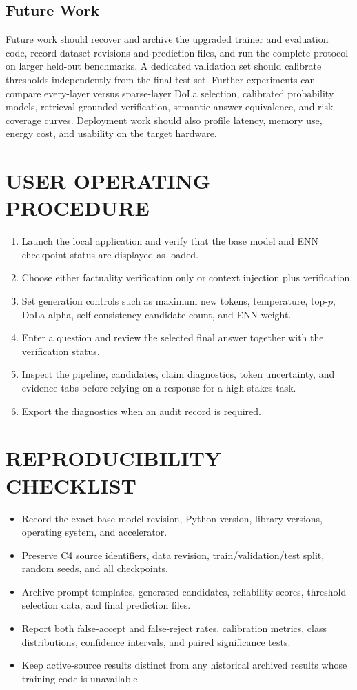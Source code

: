 \documentclass[12pt,a4paper,oneside]{report}
\begin{document}
\section{Future Work}
Future work should recover and archive the upgraded trainer and evaluation code, record dataset revisions and prediction files, and run the complete protocol on larger held-out benchmarks. A dedicated validation set should calibrate thresholds independently from the final test set. Further experiments can compare every-layer versus sparse-layer DoLa selection, calibrated probability models, retrieval-grounded verification, semantic answer equivalence, and risk-coverage curves. Deployment work should also profile latency, memory use, energy cost, and usability on the target hardware.

\appendix
\chapter{USER OPERATING PROCEDURE}
\begin{enumerate}[label=\arabic*.]
\item Launch the local application and verify that the base model and ENN checkpoint status are displayed as loaded.
\item Choose either factuality verification only or context injection plus verification.
\item Set generation controls such as maximum new tokens, temperature, top-$p$, DoLa alpha, self-consistency candidate count, and ENN weight.
\item Enter a question and review the selected final answer together with the verification status.
\item Inspect the pipeline, candidates, claim diagnostics, token uncertainty, and evidence tabs before relying on a response for a high-stakes task.
\item Export the diagnostics when an audit record is required.
\end{enumerate}

\chapter{REPRODUCIBILITY CHECKLIST}
\begin{itemize}
\item Record the exact base-model revision, Python version, library versions, operating system, and accelerator.
\item Preserve C4 source identifiers, data revision, train/validation/test split, random seeds, and all checkpoints.
\item Archive prompt templates, generated candidates, reliability scores, threshold-selection data, and final prediction files.
\item Report both false-accept and false-reject rates, calibration metrics, class distributions, confidence intervals, and paired significance tests.
\item Keep active-source results distinct from any historical archived results whose training code is unavailable.
\end{itemize}

\clearpage
{}


\end{document}
